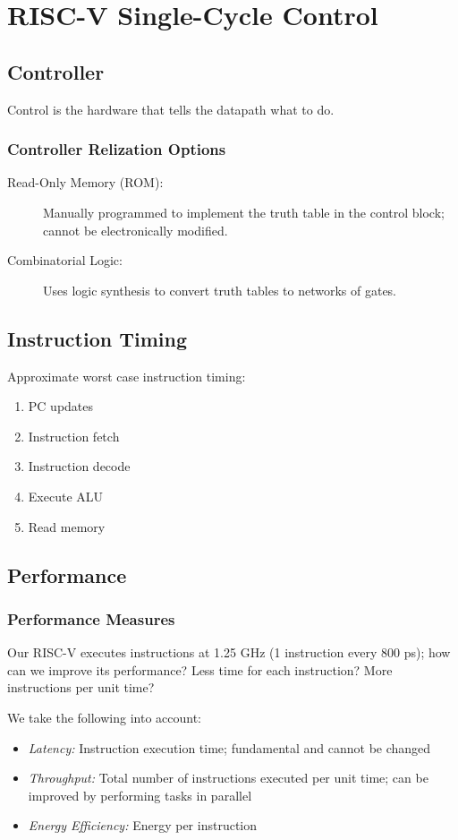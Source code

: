 \chapter{RISC-V Single-Cycle Control}

\section{Controller}
Control is the hardware that tells the datapath what to do.

\subsection{Controller Relization Options}
\begin{description}
    \item[Read-Only Memory (ROM):] Manually programmed to implement the truth table in the control block; cannot be electronically modified.
    \item[Combinatorial Logic:] Uses logic synthesis to convert truth tables to networks of gates.
\end{description}

\section{Instruction Timing}
Approximate worst case instruction timing:
\begin{enumerate}
	\item PC updates
	\item Instruction fetch
	\item Instruction decode
	\item Execute ALU
	\item Read memory
\end{enumerate}

\section{Performance}
\subsection{Performance Measures}
Our RISC-V executes instructions at 1.25 GHz (1 instruction every 800 ps); how can we improve its performance? Less time for each instruction? More instructions per unit time?

\medskip
We take the following into account:
\begin{itemize}
    \item \emph{Latency:} Instruction execution time; fundamental and cannot be changed
    \item \emph{Throughput:} Total number of instructions executed per unit time; can be improved by performing tasks in parallel
    \item \emph{Energy Efficiency:} Energy per instruction
\end{itemize}


